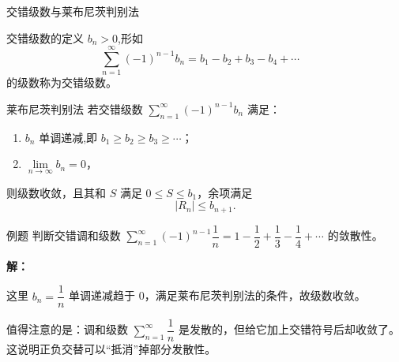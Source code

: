 \documentclass[aspectratio=169,10pt]{ctexbeamer}
\begin{document}
\begin{frame}{交错级数与莱布尼茨判别法}
	\begin{block}{交错级数的定义}
		$b_n > 0$,形如
		\[
		\sum_{n=1}^{\infty} (-1)^{n-1} b_n = b_1 - b_2 + b_3 - b_4 + \cdots \quad 
		\]
		的级数称为交错级数。
	\end{block}	
	\begin{block}{莱布尼茨判别法}
		若交错级数 \(\sum_{n=1}^{\infty} (-1)^{n-1} b_n\) 满足：
		\begin{enumerate}
			\item \(b_n\) 单调递减,即 \(b_1 \geq b_2 \geq b_3 \geq \cdots\)；
			\item \(\lim\limits_{n\to\infty} b_n = 0\)，
		\end{enumerate}
		则级数收敛，且其和 \(S\) 满足 \(0\leq S\leq b_1\)，余项满足
		\[
	|R_n|\le b_{n+1}.
		\]
	\end{block}
	
	
	
	
\end{frame}

\begin{frame}
	\begin{block}{例题}
		判断交错调和级数 \(\sum\limits_{n=1}^{\infty} (-1)^{n-1} \dfrac{1}{n} = 1 - \dfrac12 + \dfrac13 - \dfrac14 + \cdots\) 的敛散性。
	\end{block}
	
	\pause
	
	\vspace{0.8cm}
	
	\textbf{解：}
	
	
	这里 \(b_n = \dfrac{1}{n}\) 单调递减趋于 0，满足莱布尼茨判别法的条件，故级数收敛。
	
	\vspace{0.8cm}
	
	值得注意的是：调和级数 \(\sum \limits_{n=1}^{\infty}\dfrac{1}{n}\) 是发散的，但给它加上交错符号后却收敛了。这说明正负交替可以“抵消”掉部分发散性。
\end{frame}
\end{document}
